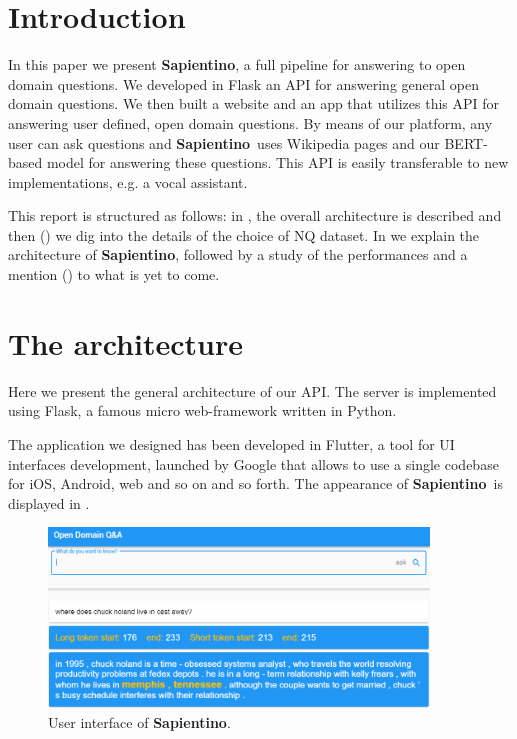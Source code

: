 \documentclass[10pt,hidelinks]{article}
\newcommand\nomefico{\textbf{Sapientino}}
\begin{document}

\newpage
{}
\setcounter{page}{1}

\section{Introduction}\label{sec:intro}

In this paper we present \nomefico, a full pipeline for answering to open domain questions.
We developed in Flask an API for answering general open domain questions.
We then built a website and an app that utilizes this API for answering user defined, open domain questions.
By means of our platform, any user can ask questions and \nomefico~uses Wikipedia pages and our BERT-based model for answering these questions. 
This API is easily transferable to new implementations, e.g. a vocal assistant.

This report is structured as follows: in , the overall architecture is described and then () we dig into the details of the choice of NQ dataset. In  we explain the architecture of \nomefico, followed by a study of the performances and a mention () to what is yet to come.

\section{The architecture}\label{sec:architecture}

Here we present the general architecture of our API.
The server is implemented using Flask, a famous micro web-framework written in Python.

The application we designed has been developed in Flutter, a tool for UI interfaces development, launched by Google that allows to use a single codebase for iOS, Android, web and so on and so forth.
The appearance of \nomefico~is displayed in .

\begin{figure}[ht!]
    \centering
    \includegraphics[width=0.9\textwidth]{report/pics/flutterWeb.png}
    \caption{User interface of \nomefico.}\label{fig:flutter}
\end{figure}
\end{document}
